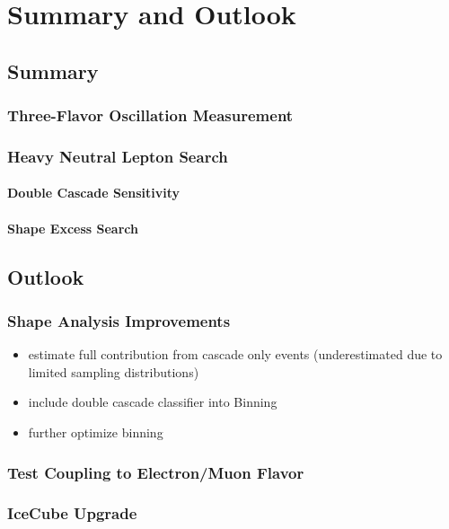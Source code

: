 \setchapterpreamble[u]{\margintoc}

\chapter{Summary and Outlook}


\section{Summary}

\subsection{Three-Flavor Oscillation Measurement}

\subsection{Heavy Neutral Lepton Search}

\subsubsection{Double Cascade Sensitivity}

\subsubsection{Shape Excess Search}


\section{Outlook}

\subsection{Shape Analysis Improvements}

\begin{itemize}
    \item estimate full contribution from cascade only events (underestimated due to limited sampling distributions)
    \item include double cascade classifier into Binning
    \item further optimize binning
\end{itemize}

\subsection{Test Coupling to Electron/Muon Flavor}

\subsection{IceCube Upgrade}
